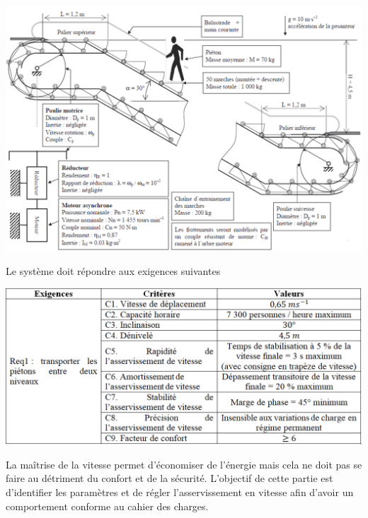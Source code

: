 \documentclass[10pt,fleqn]{article} %
\begin{document}
\begin{center}
\includegraphics[width=.95\linewidth]{images/fig_00_bis}
\end{center}

Le système doit répondre aux exigences suivantes 


\begin{center}
\includegraphics[width=.95\linewidth]{images/fig_00_ter}
\end{center}



\begin{obj}
La maîtrise de la vitesse permet d’économiser de l’énergie mais cela ne doit pas se faire au détriment du confort et de la sécurité. L’objectif de cette partie est d’identifier les paramètres et de régler l’asservissement en vitesse afin d’avoir un comportement conforme au cahier des charges.
\end{obj}
\end{document}
